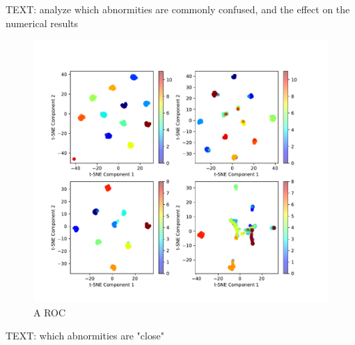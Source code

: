 \documentclass{article}
\begin{document}
	TEXT: analyze which abnormities are commonly confused, and the effect on the numerical results
	
	\begin{figure}[htbp]
		\centering
		\includegraphics[width=\linewidth]{Figs/abnormity_tSNE.pdf}
		\caption{A ROC}
		\vspace{0.3cm}
		\label{fig:A_tSNE}
	\end{figure}
	
	TEXT: which abnormities are "close"
	
\end{document}
